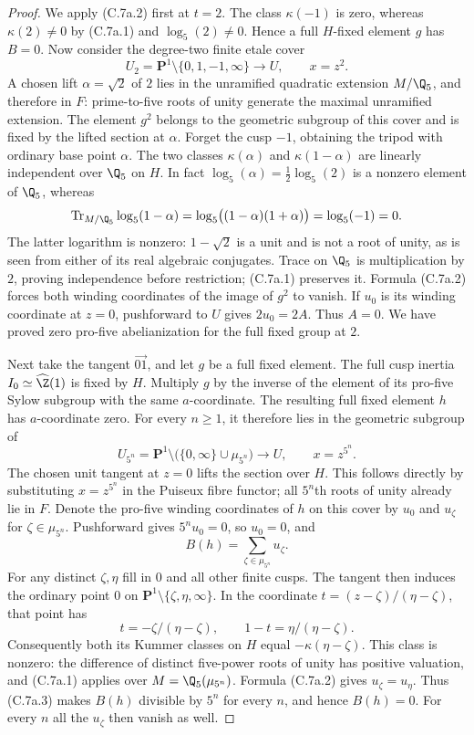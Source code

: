 \begin{proof}
We apply (C.7a.2) first at $t=2$. The class $\kappa(-1)$ is zero,
whereas $\kappa(2)\ne0$ by (C.7a.1) and $\log_5(2)\ne0$.
Hence a full $H$-fixed element $g$ has $B=0$.
Now consider the degree-two finite etale cover
\[
 U_2=\mathbf P^1\setminus\{0,1,-1,\infty\}
       \longrightarrow U,\qquad x=z^2.
\]
A chosen lift $\alpha=\sqrt2$ of $2$ lies in the unramified quadratic
extension $M/\Q_5$, and therefore in $F$: prime-to-five roots of unity
generate the maximal unramified extension. The element $g^2$ belongs to
the geometric subgroup of this cover and is fixed by the lifted section
at $\alpha$. Forget the cusp $-1$, obtaining the tripod with ordinary
base point $\alpha$.
The two classes $\kappa(\alpha)$ and $\kappa(1-\alpha)$ are linearly
independent over $\Q_5$ on $H$. In fact $\log_5(\alpha)=\frac12\log_5(2)$
is a nonzero element of $\Q_5$, whereas
\[
 \operatorname{Tr}_{M/\Q_5}\log_5(1-\alpha)
 =\log_5\bigl((1-\alpha)(1+\alpha)\bigr)=\log_5(-1)=0.
\]
The latter logarithm is nonzero: $1-\sqrt2$ is a unit and is not a root
of unity, as is seen from either of its real algebraic conjugates.
Trace on $\Q_5$ is multiplication by $2$, proving independence before
restriction; (C.7a.1) preserves it. Formula (C.7a.2) forces both winding
coordinates of the image of $g^2$ to vanish. If $u_0$ is its winding
coordinate at $z=0$, pushforward to $U$ gives $2u_0=2A$. Thus $A=0$.
We have proved zero pro-five abelianization for the full fixed group at $2$.

Next take the tangent $\overrightarrow{01}$, and let $g$ be a full fixed
element. The full cusp inertia $I_0\simeq\widehat\Z(1)$ is fixed by $H$.
Multiply $g$ by the inverse of the element of its pro-five Sylow subgroup
with the same $a$-coordinate. The resulting full fixed element $h$ has
$a$-coordinate zero. For every $n\ge1$, it therefore lies in the
geometric subgroup of
\[
 U_{5^n}=\mathbf P^1\setminus\bigl(\{0,\infty\}\cup\mu_{5^n}\bigr)
          \longrightarrow U,\qquad x=z^{5^n}.
\]
The chosen unit tangent at $z=0$ lifts the section over $H$. This follows
directly by substituting $x=z^{5^n}$ in the Puiseux fibre functor; all
$5^n$th roots of unity already lie in $F$. Denote the pro-five winding
coordinates of $h$ on this cover by $u_0$ and $u_\zeta$ for
$\zeta\in\mu_{5^n}$. Pushforward gives $5^nu_0=0$, so $u_0=0$, and
\[
 B(h)=\sum_{\zeta\in\mu_{5^n}}u_\zeta.                       \tag{C.7a.3}
\]
For any distinct $\zeta,\eta$ fill in $0$ and all other finite cusps.
The tangent then induces the ordinary point $0$ on
$\mathbf P^1\setminus\{\zeta,\eta,\infty\}$. In the coordinate
$t=(z-\zeta)/(\eta-\zeta)$, that point has
\[
 t=-\zeta/(\eta-\zeta),\qquad 1-t=\eta/(\eta-\zeta).
\]
Consequently both its Kummer classes on $H$ equal
$-\kappa(\eta-\zeta)$. This class is nonzero: the difference of distinct
five-power roots of unity has positive valuation, and (C.7a.1) applies
over $M=\Q_5(\mu_{5^n})$. Formula (C.7a.2) gives
$u_\zeta=u_\eta$. Thus (C.7a.3) makes $B(h)$ divisible by $5^n$ for
every $n$, and hence $B(h)=0$. For every $n$ all the $u_\zeta$ then vanish
as well.


\end{proof}
